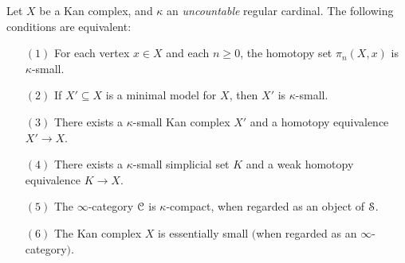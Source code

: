 \begin{corollary}\label{apegrape}Let $X$ be a Kan complex, and $\kappa$ an {\em uncountable} regular cardinal.
The following conditions are equivalent:
\begin{itemize}

\item[$(1)$] For each vertex $x \in X$ and each $n \geq 0$, the homotopy set
$\pi_n(X,x)$ is $\kappa$-small.

\item[$(2)$] If $X' \subseteq X$ is a minimal model for $X$, then $X'$ is $\kappa$-small.

\item[$(3)$] There exists a $\kappa$-small Kan complex $X'$ and a homotopy equivalence $X' \rightarrow X$.

\item[$(4)$] There exists a $\kappa$-small simplicial set $K$ and a weak homotopy equivalence $K \rightarrow X$.

\item[$(5)$] The $\infty$-category $\operatorname{\mathcal{C}}$ is $\kappa$-compact, when regarded as an object of
$\operatorname{\mathcal{S}}$.

\item[$(6)$] The Kan complex $X$ is essentially small $($when regarded as an $\infty$-category$)$.

\end{itemize}
\end{corollary}

